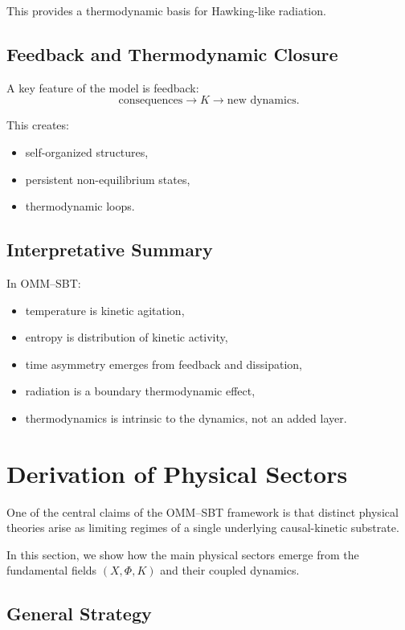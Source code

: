 \documentclass[11pt]{article}
\begin{document}
This provides a thermodynamic basis for Hawking-like radiation.

\subsection{Feedback and Thermodynamic Closure}

A key feature of the model is feedback:
\begin{equation}
\text{consequences} \rightarrow K \rightarrow \text{new dynamics}.
\end{equation}

This creates:
\begin{itemize}
\item self-organized structures,
\item persistent non-equilibrium states,
\item thermodynamic loops.
\end{itemize}

\subsection{Interpretative Summary}

In OMM--SBT:
\begin{itemize}
\item temperature is kinetic agitation,
\item entropy is distribution of kinetic activity,
\item time asymmetry emerges from feedback and dissipation,
\item radiation is a boundary thermodynamic effect,
\item thermodynamics is intrinsic to the dynamics, not an added layer.
\end{itemize}

\section{Derivation of Physical Sectors}

One of the central claims of the OMM--SBT framework is that distinct physical theories arise as limiting regimes of a single underlying causal-kinetic substrate.

In this section, we show how the main physical sectors emerge from the fundamental fields $(X, \Phi, K)$ and their coupled dynamics.

\subsection{General Strategy}
\end{document}
